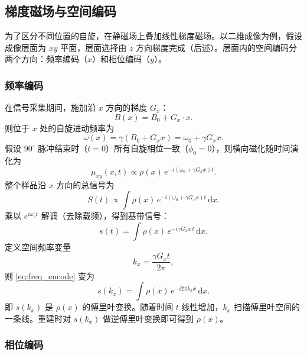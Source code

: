 \documentclass[12pt,a4paper]{article}
\begin{document}
	\subsection{梯度磁场与空间编码}
	
	为了区分不同位置的自旋，在静磁场上叠加线性梯度磁场。以二维成像为例，假设成像层面为 $xy$ 平面，层面选择由 $z$ 方向梯度完成（后述）。层面内的空间编码分两个方向：频率编码（$x$）和相位编码（$y$）。
	
	\subsubsection{频率编码}
	
	在信号采集期间，施加沿 $x$ 方向的梯度 $G_x$：
	\begin{equation}
		B(x) = B_0 + G_x \cdot x.
	\end{equation}
	则位于 $x$ 处的自旋进动频率为
	\begin{equation}
		\omega(x) = \gamma (B_0 + G_x x) = \omega_0 + \gamma G_x x.
	\end{equation}
	假设 $90^\circ$ 脉冲结束时（$t=0$）所有自旋相位一致（$\phi_0=0$），则横向磁化随时间演化为
	\begin{equation}
		\mu_{xy}(x,t) \propto \rho(x) \, e^{-i(\omega_0 + \gamma G_x x)t}.
	\end{equation}
	整个样品沿 $x$ 方向的总信号为
	\begin{equation}
		S(t) \propto \int \rho(x) \, e^{-i(\omega_0 + \gamma G_x x)t} \, \mathrm{d}x.
	\end{equation}
	乘以 $e^{i\omega_0 t}$ 解调（去除载频），得到基带信号：
	\begin{equation}
		s(t) = \int \rho(x) \, e^{-i \gamma G_x x \, t} \, \mathrm{d}x.
		\label{eq:freq_encode}
	\end{equation}
	定义空间频率变量
	\begin{equation}
		k_x = \frac{\gamma G_x t}{2\pi},
	\end{equation}
	则 \eqref{eq:freq_encode} 变为
	\begin{equation}
		s(k_x) = \int \rho(x) \, e^{-i 2\pi k_x x} \, \mathrm{d}x.
	\end{equation}
	即 $s(k_x)$ 是 $\rho(x)$ 的傅里叶变换。随着时间 $t$ 线性增加，$k_x$ 扫描傅里叶空间的一条线。重建时对 $s(k_x)$ 做逆傅里叶变换即可得到 $\rho(x)$。
	
	\subsubsection{相位编码}
	
\end{document}
